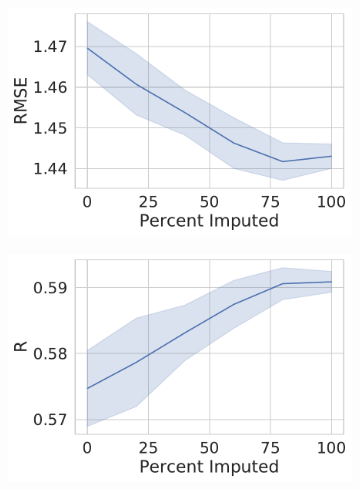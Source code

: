 \documentclass[journal=jmcmar,manuscript=article]{achemso}
\begin{document}
\begin{figure}[tbph]
    \centering
    \begin{subfigure}[t]{0.48\textwidth}
        \centering
        \includegraphics[width=\linewidth]{figures/MedGOEns_addingImpRMSE.pdf}
    \end{subfigure}
    \hfill
    \begin{subfigure}[t]{0.48\textwidth}
        \centering
        \includegraphics[width=\linewidth]{figures/MedGOEns_addingImpR.pdf}
    \end{subfigure}


\end{figure}
\end{document}
